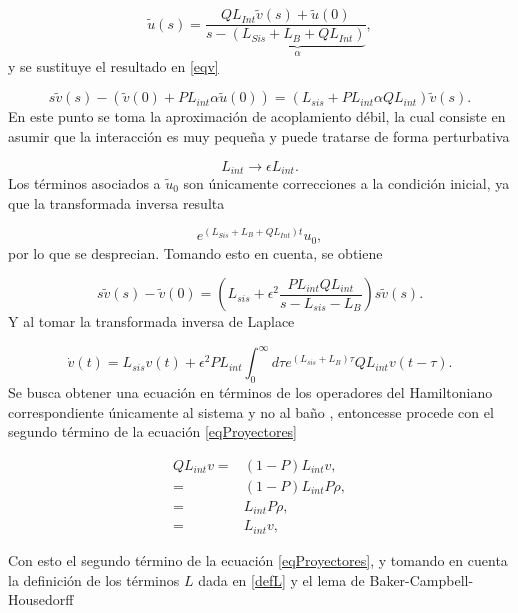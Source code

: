 \documentclass[a4paper,10pt]{report}
\begin{document}
\begin{equation}
\tilde{u}(s)=\frac{QL_{Int}\tilde{v}(s)+\tilde{u}(0)}{s-\underbrace{(L_{Sis}+L_B+QL_{Int})}_\alpha},
\end{equation} y se sustituye el resultado en \eqref{eqv}

\begin{equation}
s\tilde{v}(s)-(\tilde{v}(0)+PL_{int}\alpha\tilde{u}(0))=(L_{sis}+PL_{int}\alpha QL_{int})\tilde{v}(s).
\end{equation} En este punto se toma la aproximación de acoplamiento débil, la cual consiste en asumir que la interacción es muy pequeña y puede tratarse de forma perturbativa

\begin{equation}
L_{int} \rightarrow \epsilon L_{int}.
\end{equation} Los términos asociados a $\tilde{u}_0$ son únicamente correcciones a la condición inicial, ya que la transformada inversa resulta

\begin{equation}
e^{(L_{Sis}+L_B+QL_{Int})t}u_0,
\end{equation} por lo que se desprecian. Tomando esto en cuenta, se obtiene

\begin{equation}
s\tilde{v}(s)-\tilde{v}(0) = (L_{sis}+\epsilon^2\frac{PL_{int}QL_{int}}{s-L_{sis}-L_{B}})s\tilde{v}(s).
\end{equation} Y al tomar la transformada inversa de Laplace

\begin{equation}\label{eqProyectores}
\dot{v}(t)=L_{sis}v(t) + \epsilon^2 PL_{int} \int_{0}^{\infty}d\tau e^{(L_{sis}+L_{B})\tau}QL_{int}v(t-\tau).
\end{equation} Se busca obtener una ecuación en términos de los operadores del Hamiltoniano correspondiente únicamente al sistema y no al baño \cite{ZollerQN}, entoncesse procede con el segundo término de la ecuación \eqref{eqProyectores}

\begin{align*}
QL_{int}v=&(1-P)L_{int}v,\\
=& (1-P)L_{int}P\rho, \\
=& L_{int}P\rho, \\
=& L_{int}v,
\end{align*}

Con esto el segundo término de la ecuación \eqref{eqProyectores}, y tomando en cuenta la definición de los términos $L$ dada en \eqref{defL} y el lema de Baker-Campbell-Housedorff \cite{SakuraiQM}
\end{document}
